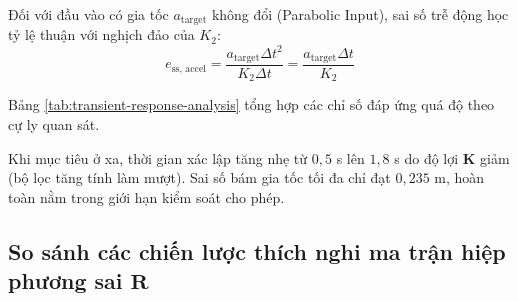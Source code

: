 Đối với đầu vào có gia tốc $a_{\text{target}}$ không đổi (Parabolic Input), sai số trễ động học tỷ lệ thuận với nghịch đảo của $K_2$:
\begin{equation}
e_{\text{ss, accel}} = \frac{a_{\text{target}} \Delta t^2}{K_2 \Delta t} = \frac{a_{\text{target}} \Delta t}{K_2}
\label{eq:accel-steady-state-error}
\end{equation}

Bảng \ref{tab:transient-response-analysis} tổng hợp các chỉ số đáp ứng quá độ theo cự ly quan sát.

\begin{table}[H]
\centering
\caption{Đặc tính đáp ứng quá độ của bộ lọc Kalman thích nghi theo cự ly quan sát}
\label{tab:transient-response-analysis}
\end{table}

Khi mục tiêu ở xa, thời gian xác lập tăng nhẹ từ $0{,}5$ s lên $1{,}8$ s do độ lợi $\mathbf{K}$ giảm (bộ lọc tăng tính làm mượt). Sai số bám gia tốc tối đa chỉ đạt $0{,}235$ m, hoàn toàn nằm trong giới hạn kiểm soát cho phép.

\subsection{So sánh các chiến lược thích nghi ma trận hiệp phương sai \texorpdfstring{$\mathbf{R}$}{R}}

